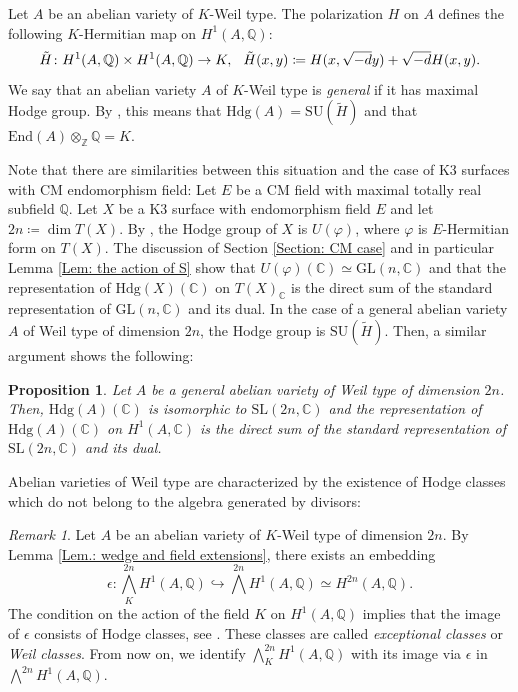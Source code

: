\documentclass[11pt,twoside,a4paper]{amsart}
\newcommand{\0}{\mathscr{O}}
\newcommand{\Q}{\mathbb{Q}}
\newcommand{\C}{\mathbb{C}}
\theoremstyle{plain}
\newtheorem{prop}[thm]{Proposition}
\theoremstyle{definition}
\theoremstyle{remark}
\newtheorem{rmk}[thm]{Remark}
\begin{document}
\smallskip

Let $A$ be an abelian variety of $K$-Weil type. The polarization $H$ on $A$ defines the following $K$-Hermitian map on $H^1(A,\Q)$:
\begin{equation}
\label{Eq.: Hermitian form abelian varieties of Weil type}
   \tilde{H}\colon H^1(A,\Q)\times H^1(A,\Q) \rightarrow K, \hspace{0.25cm} \tilde{H}(x,y)\coloneqq H(x,\sqrt{-d}y)+\sqrt{-d}H(x,y).
\end{equation}
We say that an abelian variety $A$ of $K$-Weil type is \textit{general} if it has maximal Hodge group. By \cite[Thm.\ 6.11]{van1994introduction}, this means that $\mathrm{Hdg}(A)=\mathrm{SU}(\tilde{H})$ and that $\mathrm{End}(A)\otimes_\mathbb{Z}\Q=K$.

\smallskip

Note that there are similarities between this situation and the case of K3 surfaces with CM endomorphism field:
Let $E$ be a CM field with maximal totally real subfield $\Q$. Let $X$ be a K3 surface with endomorphism field $E$ and let $2n\coloneqq \dim T(X)$. By \cite[Thm.\ 2.3.1]{zarhin1983hodge}, the Hodge group of $X$ is $U(\varphi)$, where $\varphi$ is $E$-Hermitian form on $T(X)$. The discussion of Section \ref{Section: CM case} and in particular Lemma \ref{Lem: the action of S} show that $U(\varphi)(\C)\simeq \mathrm{GL}(n,\C)$ and that the representation of $\mathrm{Hdg}(X)(\C)$ on $T(X)_\C$ is the direct sum of the standard representation of $\mathrm{GL}(n,\C)$ and its dual. 
In the case of a general abelian variety $A$ of Weil type of dimension $2n$, the Hodge group is $\mathrm{SU}(\tilde{H})$. Then, a similar argument shows the following:
\begin{prop}\cite[Lem.\ 6.10]{van1994introduction}
\label{Prop.: Hodge group of a general abelian variety of Weyl type}
Let $A$ be a general abelian variety of Weil type of dimension $2n$. Then, $\mathrm{Hdg}(A)(\C)$ is isomorphic to $\mathrm{SL}(2n,\C)$ and the representation of $\mathrm{Hdg}(A)(\C)$ on $H^1(A,\C)$ is the direct sum of the standard representation of $\mathrm{SL}(2n,\C)$ and its dual.
\end{prop}

Abelian varieties of Weil type are characterized by the existence of Hodge classes which do not belong to the algebra generated by divisors:
\begin{rmk}
\label{Rmk.: exceptional classes on A}
Let $A$ be an abelian variety of $K$-Weil type of dimension $2n$. By Lemma \ref{Lem.: wedge and field extensions}, there exists an embedding
\[
\textstyle\epsilon\colon\bigwedge_{K}^{2n} H^1(A,\Q)\hookrightarrow \bigwedge^{2n} H^1(A,\Q)\simeq H^{2n}(A,\Q).
\]
The condition on the action of the field $K$ on $H^1(A,\Q)$ implies that the image of $\epsilon$ consists of Hodge classes, see \cite[Prop.\ 4.4]{deligne1982hodge}. These classes are called \textit{exceptional classes} or \textit{Weil classes}. From now on, we identify $\bigwedge_{K}^{2n} H^1(A,\Q)$ with its image via $\epsilon$ in $\bigwedge^{2n} H^1(A,\Q)$.
\end{rmk}
\end{document}
